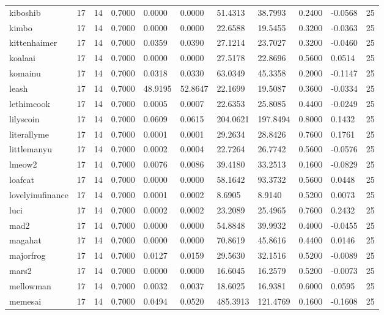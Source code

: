 \begin{table}[htbp]
\begin{tabular}{lllllllllll}
kiboshib & 17 & 14 & 0.7000 & 0.0000 & 0.0000 & 51.4313 & 38.7993 & 0.2400 & -0.0568 & 25 \\
kimbo & 17 & 14 & 0.7000 & 0.0000 & 0.0000 & 22.6588 & 19.5455 & 0.3200 & -0.0363 & 25 \\
kittenhaimer & 17 & 14 & 0.7000 & 0.0359 & 0.0390 & 27.1214 & 23.7027 & 0.3200 & -0.0460 & 25 \\
koalaai & 17 & 14 & 0.7000 & 0.0000 & 0.0000 & 27.5178 & 22.8696 & 0.5600 & 0.0514 & 25 \\
komainu & 17 & 14 & 0.7000 & 0.0318 & 0.0330 & 63.0349 & 45.3358 & 0.2000 & -0.1147 & 25 \\
leash & 17 & 14 & 0.7000 & 48.9195 & 52.8647 & 22.1699 & 19.5087 & 0.3600 & -0.0334 & 25 \\
lethimcook & 17 & 14 & 0.7000 & 0.0005 & 0.0007 & 22.6353 & 25.8085 & 0.4400 & -0.0249 & 25 \\
lilyscoin & 17 & 14 & 0.7000 & 0.0609 & 0.0615 & 204.0621 & 197.8494 & 0.8000 & 0.1432 & 25 \\
literallyme & 17 & 14 & 0.7000 & 0.0001 & 0.0001 & 29.2634 & 28.8426 & 0.7600 & 0.1761 & 25 \\
littlemanyu & 17 & 14 & 0.7000 & 0.0002 & 0.0004 & 22.7264 & 26.7742 & 0.5600 & -0.0576 & 25 \\
lmeow2 & 17 & 14 & 0.7000 & 0.0076 & 0.0086 & 39.4180 & 33.2513 & 0.1600 & -0.0829 & 25 \\
loafcat & 17 & 14 & 0.7000 & 0.0000 & 0.0000 & 58.1642 & 93.3732 & 0.5600 & 0.0448 & 25 \\
lovelyinufinance & 17 & 14 & 0.7000 & 0.0001 & 0.0002 & 8.6905 & 8.9140 & 0.5200 & 0.0073 & 25 \\
luci & 17 & 14 & 0.7000 & 0.0002 & 0.0002 & 23.2089 & 25.4965 & 0.7600 & 0.2432 & 25 \\
mad2 & 17 & 14 & 0.7000 & 0.0000 & 0.0000 & 54.8848 & 39.9932 & 0.4000 & -0.0455 & 25 \\
magahat & 17 & 14 & 0.7000 & 0.0000 & 0.0000 & 70.8619 & 45.8616 & 0.4400 & 0.0146 & 25 \\
majorfrog & 17 & 14 & 0.7000 & 0.0127 & 0.0159 & 29.5630 & 32.1516 & 0.5200 & -0.0089 & 25 \\
mars2 & 17 & 14 & 0.7000 & 0.0000 & 0.0000 & 16.6045 & 16.2579 & 0.5200 & -0.0073 & 25 \\
mellowman & 17 & 14 & 0.7000 & 0.0032 & 0.0037 & 18.6025 & 16.9381 & 0.6000 & 0.0595 & 25 \\
memesai & 17 & 14 & 0.7000 & 0.0494 & 0.0520 & 485.3913 & 121.4769 & 0.1600 & -0.1608 & 25 \\

\end{tabular}
\end{table}
